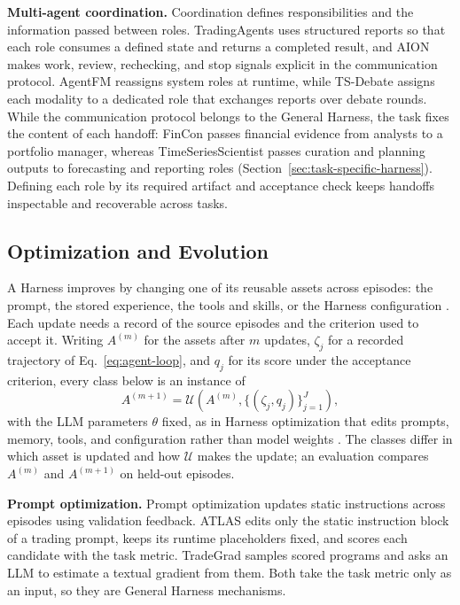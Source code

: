 \documentclass[preprints,article,submit,moreauthors]{Definitions/mdpi}
\begin{document}
\noindent\textbf{Multi-agent coordination.} Coordination defines responsibilities and the information passed between roles. TradingAgents \citep{tradingagents2024} uses structured reports so that each role consumes a defined state and returns a completed result, and AION \citep{aion2026} makes work, review, rechecking, and stop signals explicit in the communication protocol. AgentFM \citep{agentfm2025} reassigns system roles at runtime, while TS-Debate \citep{multimodaldebate2026} assigns each modality to a dedicated role that exchanges reports over debate rounds. While the communication protocol belongs to the General Harness, the task fixes the content of each handoff: FinCon \citep{fincon2024} passes financial evidence from analysts to a portfolio manager, whereas TimeSeriesScientist \citep{timeseriesscientist2025} passes curation and planning outputs to forecasting and reporting roles (Section~\ref{sec:task-specific-harness}). Defining each role by its required artifact and acceptance check keeps handoffs inspectable and recoverable across tasks.

\subsection{Optimization and Evolution}
\label{sec:gh-optimization}

A Harness improves by changing one of its reusable assets across episodes: the prompt, the stored experience, the tools and skills, or the Harness configuration \citep{lin2026agenticharness}. Each update needs a record of the source episodes and the criterion used to accept it. Writing $A^{(m)}$ for the assets after $m$ updates, $\zeta_j$ for a recorded trajectory of Eq.~\eqref{eq:agent-loop}, and $q_j$ for its score under the acceptance criterion, every class below is an instance of
\begin{equation}
  A^{(m+1)}=\mathcal{U}\!\left(A^{(m)},\{(\zeta_j,q_j)\}_{j=1}^{J}\right),
  \label{eq:asset-update}
\end{equation}
with the LLM parameters $\theta$ fixed, as in Harness optimization that edits prompts, memory, tools, and configuration rather than model weights \citep{lin2026agenticharness}. The classes differ in which asset is updated and how $\mathcal{U}$ makes the update; an evaluation compares $A^{(m)}$ and $A^{(m+1)}$ on held-out episodes.

\noindent\textbf{Prompt optimization.} Prompt optimization updates static instructions across episodes using validation feedback. ATLAS \citep{atlas2025} edits only the static instruction block of a trading prompt, keeps its runtime placeholders fixed, and scores each candidate with the task metric. TradeGrad \citep{textualgradienttrading2026} samples scored programs and asks an LLM to estimate a textual gradient from them. Both take the task metric only as an input, so they are General Harness mechanisms.
\end{document}
